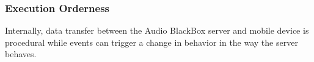 \subsubsection{Execution Orderness}
    Internally, data transfer between the Audio BlackBox server and mobile device is procedural while events can trigger a change in behavior in the way the server behaves.